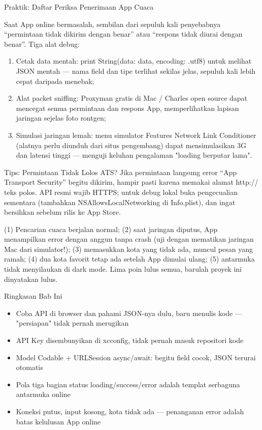 \begin{tcbpractice}{Praktik: Daftar Periksa Penerimaan App Cuaca}

Saat App online bermasalah, sembilan dari sepuluh kali penyebabnya “permintaan tidak dikirim dengan benar” atau “respons tidak diurai dengan benar”. Tiga alat debug:

\begin{enumerate}
  \item Cetak data mentah: print String(data: data, encoding: .utf8) untuk melihat JSON mentah — nama field dan tipe terlihat sekilas jelas, sepuluh kali lebih cepat daripada menebak;
  \item Alat packet sniffing: Proxyman gratis di Mac / Charles open source dapat mencegat semua permintaan dan respons App, memperlihatkan lapisan jaringan sejelas foto rontgen;
  \item Simulasi jaringan lemah: menu simulator Features Network Link Conditioner (alatnya perlu diunduh dari situs pengembang) dapat mensimulasikan 3G dan latensi tinggi — menguji keluhan pengalaman "loading berputar lama".
\end{enumerate}

\begin{tcbinfo}{Tips: Permintaan Tidak Lolos ATS?}
Jika permintaan langsung error “App Transport Security” begitu dikirim, hampir pasti karena memakai alamat http:// teks polos. API resmi wajib HTTPS; untuk debug lokal buka pengecualian sementara (tambahkan NSAllowsLocalNetworking di Info.plist), dan ingat bersihkan sebelum rilis ke App Store.

\end{tcbinfo}

(1) Pencarian cuaca berjalan normal; (2) saat jaringan diputus, App menampilkan error dengan anggun tanpa crash (uji dengan mematikan jaringan Mac dari simulator!); (3) memasukkan kota yang tidak ada, muncul pesan yang ramah; (4) dua kota favorit tetap ada setelah App dimulai ulang; (5) antarmuka tidak menyilaukan di dark mode. Lima poin lulus semua, barulah proyek ini dinyatakan lulus.

\end{tcbpractice}

\begin{tcbsummary}{Ringkasan Bab Ini}
\begin{itemize}
  \item Coba API di browser dan pahami JSON-nya dulu, baru menulis kode — "persiapan" tidak pernah merugikan
  \item API Key disembunyikan di xcconfig, tidak pernah masuk repositori kode
  \item Model Codable + URLSession async/await: begitu field cocok, JSON terurai otomatis
  \item Pola tiga bagian status loading/success/error adalah templat serbaguna antarmuka online
  \item Koneksi putus, input kosong, kota tidak ada — penanganan error adalah batas kelulusan App online
\end{itemize}

\end{tcbsummary}
